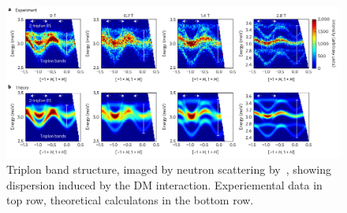 \documentclass{thesis-umich}
\begin{document}
\begin{figure}
	\centering
	\caption[Triplon Bands in SCBO]{Triplon band structure, imaged by neutron scattering by~\cite{McClarty2017}, showing dispersion induced by the DM interaction. Experiemental data in top row, theoretical calculatons in the bottom row.}
	\includegraphics[width=\columnwidth]{figures/SCBO_triplon_bands_McClarty.pdf}
\end{figure}
\end{document}
